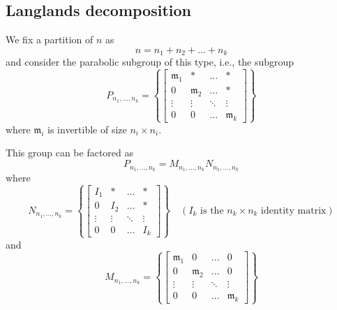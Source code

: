 \documentclass[12pt]{article} %
\begin{document}
\subsection{Langlands decomposition}
We fix a partition of $n$ as
\[n=n_1+n_2+\ldots+n_k\]
and consider the parabolic subgroup of this type, i.e., the subgroup
\[P_{n_1,\ldots, n_k} = \left\lbrace \begin{bmatrix}
        \mathfrak{m}_1 & \ast           & \ldots & \ast           \\
        0              & \mathfrak{m}_2 & \ldots & \ast           \\
        \vdots         & \vdots         & \ddots & \vdots         \\
        0              & 0              & \ldots & \mathfrak{m}_k
    \end{bmatrix} \right\rbrace\]
where $\mathfrak{m}_i$ is invertible of size $n_i \times n_i$.

This group can be factored as
\[P_{n_1,\ldots, n_k} =M_{n_1,\ldots, n_k}N_{n_1,\ldots, n_k}\]
where
\[N_{n_1,\ldots, n_k} = \left\lbrace \begin{bmatrix}
        I_1    & \ast   & \ldots & \ast   \\
        0      & I_2    & \ldots & \ast   \\
        \vdots & \vdots & \ddots & \vdots \\
        0      & 0      & \ldots & I_k
    \end{bmatrix} \right\rbrace \quad \left(I_k \text{ is the $n_k\times n_k$ identity matrix}\right)\]
and
\[M_{n_1,\ldots, n_k} = \left\lbrace \begin{bmatrix}
        \mathfrak{m}_1 & 0              & \ldots & 0              \\
        0              & \mathfrak{m}_2 & \ldots & 0              \\
        \vdots         & \vdots         & \ddots & \vdots         \\
        0              & 0              & \ldots & \mathfrak{m}_k
    \end{bmatrix} \right\rbrace\]
\end{document}

